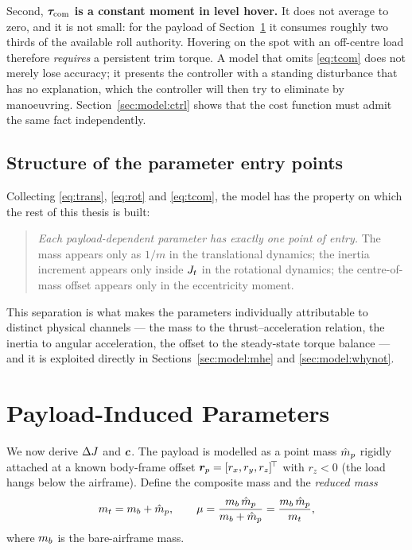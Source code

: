 Second, \textbf{$\bm{\tau}_{\mathrm{com}}$ is a constant moment in level hover.} It does not
average to zero, and it is not small: for the payload of
Section~\ref{sec:model:payload} it consumes roughly two thirds of the
available roll authority. Hovering on the spot with an off-centre load
therefore \emph{requires} a persistent trim torque. A model that omits
\eqref{eq:tcom} does not merely lose accuracy; it presents the controller
with a standing disturbance that has no explanation, which the controller
will then try to eliminate by manoeuvring. Section~\ref{sec:model:ctrl}
shows that the cost function must admit the same fact independently.

\subsection{Structure of the parameter entry points}\label{sec:model:entry}

Collecting \eqref{eq:trans}, \eqref{eq:rot} and \eqref{eq:tcom}, the model
has the property on which the rest of this thesis is built:

\begin{quote}
\emph{Each payload-dependent parameter has exactly one point of entry.}
The mass appears only as $1/m$ in the translational dynamics; the inertia
increment appears only inside $J_t$ in the rotational dynamics; the
centre-of-mass offset appears only in the eccentricity moment.
\end{quote}

This separation is what makes the parameters individually attributable to
distinct physical channels --- the mass to the thrust--acceleration
relation, the inertia to angular acceleration, the offset to the
steady-state torque balance --- and it is exploited directly in
Sections~\ref{sec:model:mhe} and \ref{sec:model:whynot}.

\section{Payload-Induced Parameters}\label{sec:model:payload}

We now derive $\Delta J$ and $\bm{c}$. The payload is modelled as a point mass
$\hat{m}_p$ rigidly attached at a known body-frame offset
$\bm{r}_p = [r_x, r_y, r_z]^{\!\top}$ with $r_z < 0$ (the load hangs below the
airframe). Define the composite mass and the \emph{reduced mass}
\begin{equation}
m_t = m_b + \hat{m}_p,
\qquad
\mu = \frac{m_b\, \hat{m}_p}{m_b + \hat{m}_p} = \frac{m_b\, \hat{m}_p}{m_t},
\label{eq:mu}
\end{equation}
where $m_b$ is the bare-airframe mass.

